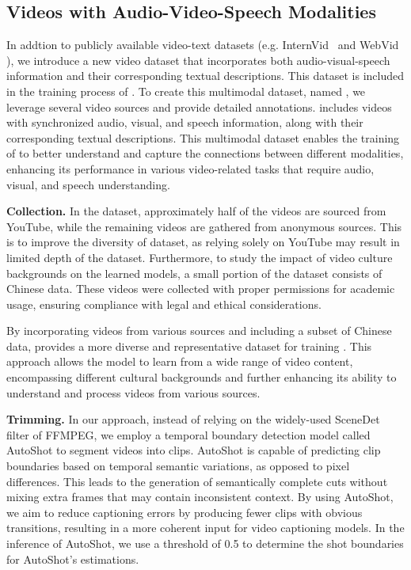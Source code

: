 \subsection{Videos with Audio-Video-Speech Modalities} \label{supp:avs_anno}
In addtion to publicly available video-text datasets (e.g. InternVid~\citep{wang2023internvid} and WebVid \citep{webvid}), we introduce a new video dataset that incorporates both audio-visual-speech information and their corresponding textual descriptions. This dataset is included in the training process of {\modelname}. To create this multimodal dataset, named {\dataname}, we leverage several video sources and provide detailed annotations. {\dataname} includes videos with synchronized audio, visual, and speech information, along with their corresponding textual descriptions. This multimodal dataset enables the training of {\modelname} to better understand and capture the connections between different modalities, enhancing its performance in various video-related tasks that require audio, visual, and speech understanding.

\noindent\textbf{Collection.}
In the {\dataname} dataset, approximately half of the videos are sourced from YouTube, while the remaining videos are gathered from anonymous sources. This is to improve the diversity of dataset, as relying solely on YouTube may result in limited depth of the dataset.
Furthermore, to study the impact of video culture backgrounds on the learned models, a small portion of the dataset consists of Chinese data. These videos were collected with proper permissions for academic usage, ensuring compliance with legal and ethical considerations.

By incorporating videos from various sources and including a subset of Chinese data, {\dataname} provides a more diverse and representative dataset for training {\modelname}. This approach allows the model to learn from a wide range of video content, encompassing different cultural backgrounds and further enhancing its ability to understand and process videos from various sources.

\noindent\textbf{Trimming.}
In our approach, instead of relying on the widely-used SceneDet filter of FFMPEG, we employ a temporal boundary detection model called AutoShot \cite{zhu2023autoshot} to segment videos into clips. AutoShot is capable of predicting clip boundaries based on temporal semantic variations, as opposed to pixel differences. This leads to the generation of semantically complete cuts without mixing extra frames that may contain inconsistent context. By using AutoShot, we aim to reduce captioning errors by producing fewer clips with obvious transitions, resulting in a more coherent input for video captioning models. In the inference of AutoShot, we use a threshold of 0.5 to determine the shot boundaries for AutoShot's estimations. 

